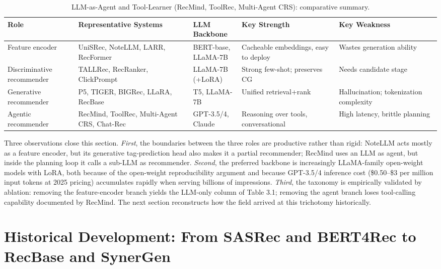 \documentclass{article}
\begin{document}
\begin{table}[t]
\centering
\caption{LLM-as-Agent and Tool-Learner (RecMind, ToolRec, Multi-Agent CRS): comparative summary.}
\label{tab:llm-as-agent-and-tool-learner-recmind-toolrec-multi-agent-cr}
\begin{tabular}{>{\raggedright\arraybackslash}p{0.1605\linewidth}
  >{\raggedright\arraybackslash}p{0.2654\linewidth}
  >{\raggedright\arraybackslash}p{0.1173\linewidth}
  >{\raggedright\arraybackslash}p{0.2222\linewidth}
  >{\raggedright\arraybackslash}p{0.2346\linewidth}}
\toprule
Role & Representative Systems & LLM Backbone & Key Strength & Key Weakness \\
\midrule
Feature encoder & UniSRec, NoteLLM, LARR, RecFormer & BERT-base, LLaMA-7B & Cacheable embeddings, easy to deploy & Wastes generation ability \\
Discriminative recommender & TALLRec, RecRanker, ClickPrompt & LLaMA-7B (+LoRA) & Strong few-shot; preserves CG & Needs candidate stage \\
Generative recommender & P5, TIGER, BIGRec, LLaRA, RecBase & T5, LLaMA-7B & Unified retrieval+rank & Hallucination; tokenization complexity \\
Agentic recommender & RecMind, ToolRec, Multi-Agent CRS, Chat-Rec & GPT-3.5/4, Claude & Reasoning over tools, conversational & High latency, brittle planning \\
\end{tabular}
\end{table}

Three observations close this section. \emph{First}, the boundaries between the three roles are productive rather than rigid: NoteLLM acts mostly as a feature encoder, but its generative tag-prediction head also makes it a partial recommender; RecMind uses an LLM as agent, but inside the planning loop it calls a sub-LLM as recommender. \emph{Second}, the preferred backbone is increasingly LLaMA-family open-weight models with LoRA, both because of the open-weight reproducibility argument and because GPT-3.5/4 inference cost (\$0.50--\$3 per million input tokens at 2025 pricing) accumulates rapidly when serving billions of impressions. \emph{Third}, the taxonomy is empirically validated by ablation: removing the feature-encoder branch yields the LLM-only column of Table 3.1; removing the agent branch loses tool-calling capability documented by RecMind. The next section reconstructs how the field arrived at this trichotomy historically.

\section{Historical Development: From SASRec and BERT4Rec to RecBase and SynerGen}\label{historical-development-from-sasrec-and-bert4rec-to-recbase-and-synergen}
\end{document}
